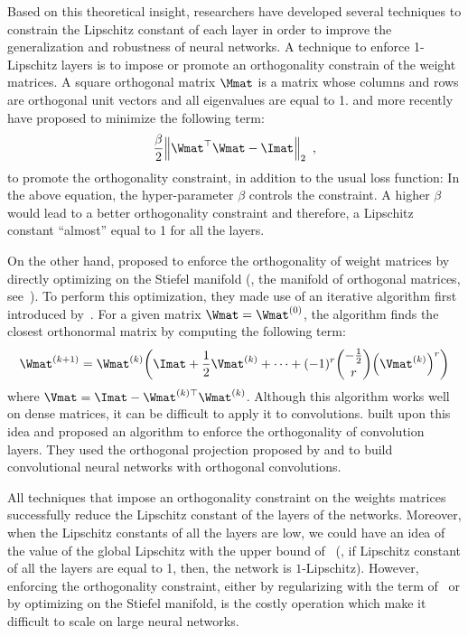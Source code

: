 Based on this theoretical insight, researchers have developed several techniques to constrain the Lipschitz constant of each layer in order to improve the generalization and robustness of neural networks.
A technique to enforce 1-Lipschitz layers is to impose or promote an orthogonality constrain of the weight matrices.
A square orthogonal matrix $\Mmat$ is a matrix whose columns and rows are orthogonal unit vectors and all eigenvalues are equal to 1.
\citet{cisse2017parseval} and more recently \citet{wang2020orthogonal,huang2020controllable} have proposed to minimize the following term:
\begin{equation} \label{equation:ch3-orthogonality_constraint}
  \frac{\beta}{2} \norm{\Wmat^\top \Wmat - \Imat}_2  \enspace, 
\end{equation}
to promote the orthogonality constraint, in addition to the usual loss function:
In the above equation, the hyper-parameter $\beta$ controls the constraint.
A higher $\beta$ would lead to a better orthogonality constraint and therefore, a Lipschitz constant ``almost'' equal to 1 for all the layers.

On the other hand, \citet{anil2019sorting} proposed to enforce the orthogonality of weight matrices by directly optimizing on the Stiefel
manifold (\ie, the manifold of orthogonal matrices, see~\citet{absil2009optimization}).
To perform this optimization, they made use of an iterative algorithm first introduced by~\citet{bjorck1971iterative}.
For a given matrix $\Wmat = \Wmat^{(0)}$, the algorithm finds the closest orthonormal matrix by computing the following term:
\begin{equation}
  \Wmat^{(k+1)} = \Wmat^{(k)} \left( \Imat + \frac{1}{2} \Vmat^{(k)} + \cdots + (-1)^r {-\frac{1}{2} \choose r}  \left(\Vmat^{(k)}\right)^r \right)
\end{equation}
where $\Vmat = \Imat - \Wmat^{(k)\top} \Wmat^{(k)}$.
Although this algorithm works well on dense matrices, it can be difficult to apply it to convolutions. 
\citet{li2019preventing} built upon this idea and proposed an algorithm to enforce the orthogonality of convolution layers.
They used the orthogonal projection proposed by \citet{kautsky1994matrix} and \citet{xiao2018dynamical} to build convolutional neural networks with orthogonal convolutions.

All techniques that impose an orthogonality constraint on the weights matrices successfully reduce the Lipschitz constant of the layers of the networks.
Moreover, when the Lipschitz constants of all the layers are low, we could have an idea of the value of the global Lipschitz with the upper bound of~ (\ie, if Lipschitz constant of all the layers are equal to 1, then, the network is $1$-Lipschitz).
However, enforcing the orthogonality constraint, either by regularizing with the term of~ or by optimizing on the Stiefel manifold, is the costly operation which make it difficult to scale on large neural networks.




